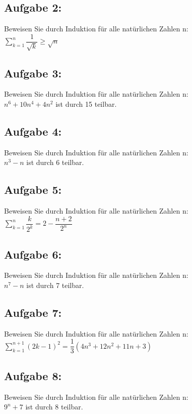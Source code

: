 \documentclass[11pt,final]{scrreprt}
\begin{document}
\subsection*{Aufgabe 2:}
Beweisen Sie durch Induktion für 
alle natürlichen Zahlen n:\\
\hspace*{2em}$ \sum\limits_{k=1}^n \dfrac{1}{\sqrt{k}} \geq \sqrt{n} $

\subsection*{Aufgabe 3:}
Beweisen Sie durch Induktion für alle natürlichen Zahlen n:\\
\hspace*{2em}$ n^6+10n^4+4n^2 $ ist durch 15 teilbar.

\subsection*{Aufgabe 4:}
Beweisen Sie durch Induktion für alle natürlichen Zahlen n:\\
\hspace*{2em}$ n^3 - n $ ist durch 6 teilbar.

\subsection*{Aufgabe 5:}
Beweisen Sie durch Induktion für alle natürlichen Zahlen n:\\
\hspace*{2em}$ \sum\limits_{k=1}^n \dfrac{k}{2^k} = 2- \dfrac{n+2}{2^n} $

\subsection*{Aufgabe 6:}
Beweisen Sie durch Induktion für alle natürlichen Zahlen n:\\
\hspace*{2em}$ n^7 - n $ ist durch 7 teilbar.

\subsection*{Aufgabe 7:}
Beweisen Sie durch Induktion für alle natürlichen Zahlen n:\\
\hspace*{2em}$ \sum\limits_{k=1}^{n+1} (2k-1)^2 = \dfrac{1}{3} (4n^3+12n^2+11n+3) $

\subsection*{Aufgabe 8:}
Beweisen Sie durch Induktion für alle natürlichen Zahlen n:\\
\hspace*{2em}$ 9^n + 7 $ ist durch 8 teilbar.
\end{document}
